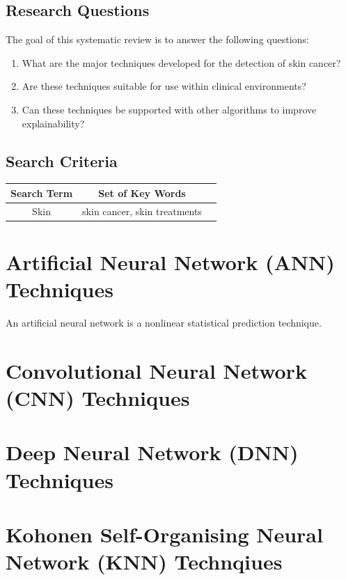 \subsection{Research Questions}
The goal of this systematic review is to answer the following questions:

\begin{enumerate}
	\item What are the major techniques developed for the detection of skin cancer?
	\item Are these techniques suitable for use within clinical environments?
	\item Can these techniques be supported with other algorithms to improve explainability?
\end{enumerate}

\subsection{Search Criteria}

\begin{table}
	\begin{tabular}{|c|c|c|}
	\hline
	Search Term & Set of Key Words \\
	\hline
	Skin & skin cancer, skin treatments \\
	\hline
	\end{tabular}

\end{table}

\section{Artificial Neural Network (ANN) Techniques}
An artificial neural network is a nonlinear statistical prediction technique.

\section{ Convolutional Neural Network (CNN) Techniques}

\section{Deep Neural Network (DNN) Techniques}

\section{Kohonen Self-Organising Neural Network (KNN) Technqiues}

